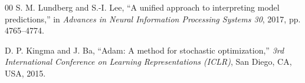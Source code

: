 \documentclass[conference]{IEEEtran}
\begin{document}
\begin{thebibliography}{00}
S. M. Lundberg and S.-I. Lee, ``A unified approach to interpreting model predictions,'' in \textit{Advances in Neural Information Processing Systems 30}, 2017, pp. 4765--4774.

D. P. Kingma and J. Ba, ``Adam: A method for stochastic optimization,'' \emph{3rd International Conference on Learning Representations (ICLR)}, San Diego, CA, USA, 2015.


\end{thebibliography}
\end{document}
